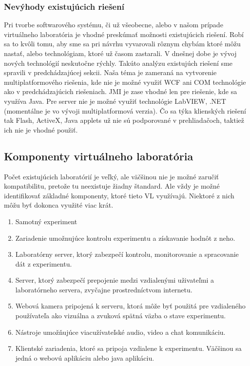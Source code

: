 \subsubsection{Nevýhody existujúcich riešení}
Pri tvorbe softwarového systému, či už všeobecne, alebo v našom prípade virtuálneho laboratória je vhodné preskúmať možnosti existujúcich riešení. Robí sa to kvôli tomu, aby sme sa pri návrhu vyvarovali rôznym chybám ktoré môžu nastať, alebo technológiam, ktoré už časom zastarali. V dnešnej dobe je vývoj nových technológií neskutočne rýchly. Takúto analýzu existujúch riešení sme spravili v predchádzajúcej sekcii.
Naša téma je zameraná na vytvorenie multiplatformového riešenia, kde nie je možné využiť WCF ani COM technológie ako v predchádzajúcich riešeniach. JMI je zase vhodné len pre riešenie, kde sa využíva Java. Pre server nie je možné využiť technológie LabVIEW, .NET (momentálne je vo vývoji multiplatformová verzia). Čo sa týka klienských riešení tak Flash, ActiveX, Java applets už nie sú podporované v prehliadačoch, taktiež ich nie je vhodné použiť.

\subsection{Komponenty virtuálneho laboratória}
Počet existujúcich laboratórií je veľký, ale väčšinou nie je možné zaručiť kompatibilitu, pretože tu neexistuje žiadny štandard. Ale vždy je možné identifikovať základné komponenty, ktoré tieto VL využívajú. Niektoré z nich môžu byť dokonca využité viac krát.\cite{article-components-vl}

\begin{enumerate}
  \item Samotný experiment
  \item Zariadenie umožnujúce kontrolu experimentu a získavanie hodnôt z neho.
  \item Laboratórny server, ktorý zabezpečí kontrolu, monitorovanie a spracovanie dát z experimentu.
  \item Server, ktorý zabezpečí prepojenie medzi vzdialenými uživateľmi a laboratórneho servera, zvyčajne prostredníctvom internetu.
  \item Webová kamera pripojená k serveru, ktorá môže byť použitá pre vzdialeného používateľa ako vizuálna a zvuková spätná väzba o stave experimentu.
  \item Nástroje umožňujúce viacužívateľské audio, video a chat komunikáciu.
  \item Klientské zariadenia, ktoré sa pripoja vzdialene k experimentu. Väčšinou sa jedná o webovú aplikáciu alebo java aplikáciu.
\end{enumerate}

